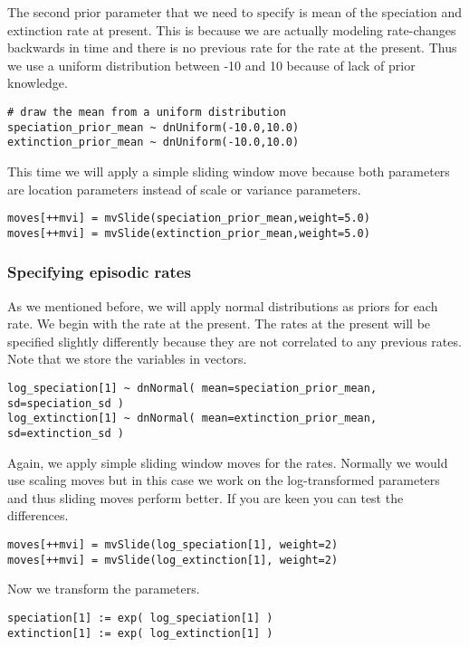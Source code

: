 The second prior parameter that we need to specify is mean of the speciation and extinction rate at present.
This is because we are actually modeling rate-changes backwards in time and there is no previous rate for the rate at the present.
Thus we use a uniform distribution between -10 and 10 because of lack of prior knowledge.
{\tt \begin{snugshade*}
\begin{lstlisting}
# draw the mean from a uniform distribution
speciation_prior_mean ~ dnUniform(-10.0,10.0)
extinction_prior_mean ~ dnUniform(-10.0,10.0)
\end{lstlisting}
\end{snugshade*}}
This time we will apply a simple sliding window move because both parameters are location parameters instead of scale or variance parameters.
{\tt \begin{snugshade*}
\begin{lstlisting}
moves[++mvi] = mvSlide(speciation_prior_mean,weight=5.0)
moves[++mvi] = mvSlide(extinction_prior_mean,weight=5.0)
\end{lstlisting}
\end{snugshade*}}


\subsubsection{Specifying episodic rates}
As we mentioned before, we will apply normal distributions as priors for each rate.
We begin with the rate at the present.
The rates at the present will be specified slightly differently because they are not correlated to any previous rates.
Note that we store the variables in vectors.
{\tt \begin{snugshade*}
\begin{lstlisting}
log_speciation[1] ~ dnNormal( mean=speciation_prior_mean, sd=speciation_sd )
log_extinction[1] ~ dnNormal( mean=extinction_prior_mean, sd=extinction_sd )
\end{lstlisting}
\end{snugshade*}}
Again, we apply simple sliding window moves for the rates.
Normally we would use scaling moves but in this case we work on the log-transformed parameters and thus sliding moves perform better.
If you are keen you can test the differences.
{\tt \begin{snugshade*}
\begin{lstlisting}
moves[++mvi] = mvSlide(log_speciation[1], weight=2)
moves[++mvi] = mvSlide(log_extinction[1], weight=2)
\end{lstlisting}
\end{snugshade*}}
Now we transform the parameters.
{\tt \begin{snugshade*}
\begin{lstlisting}
speciation[1] := exp( log_speciation[1] )
extinction[1] := exp( log_extinction[1] )
\end{lstlisting}
\end{snugshade*}}

